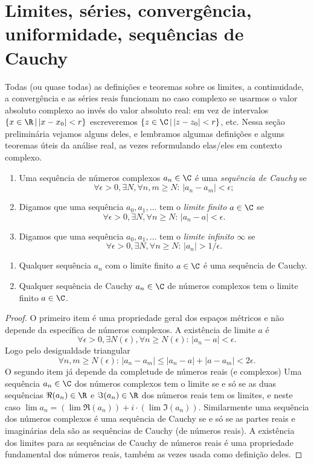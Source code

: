 \section{Limites, séries, convergência, uniformidade, sequências de Cauchy}

Todas (ou quase todas) as definições e teoremas sobre os limites, a continuidade,
a convergência e as séries reais funcionam no caso complexo
se usarmos o valor absoluto complexo ao invés do valor absoluto real:
em vez de intervalos $\{x\in \R\,|\,|x-x_0|<r\}$ escreveremos $\{z\in \C\,|\,|z-z_0|<r\}$, etc.
Nessa seção preliminária vejamos alguns deles, e lembramos algumas definições
e alguns teoremas úteis da análise real, as vezes reformulando elas/eles em contexto complexo.

\begin{defin}
\begin{enumerate}
\item Uma sequência de números complexos $a_n\in\C$ é uma \emph{sequência de Cauchy} se
\[ \forall \epsilon>0, \exists N, \forall n,m\geq N:\, |a_n-a_m| <\epsilon; \]
\item Digamos que uma sequência $a_0,a_1,\dots$ tem o \emph{limite finito} $a\in\C$ se
\[ \forall \epsilon> 0, \exists N, \forall n\geq N: \, |a_n-a| < \epsilon. \]
\item Digamos que uma sequência $a_0,a_1,\dots$ tem o \emph{limite infinito} $\infty$ se
\[ \forall \epsilon> 0, \exists N, \forall n\geq N: \, |a_n| > 1/\epsilon. \]
\end{enumerate}
\end{defin}

\begin{prop}
\label{cauchy-limite}
\begin{enumerate}
\item Qualquer sequência $a_n$ com o limite finito $a\in\C$ é uma sequência de Cauchy.
\item Qualquer sequência de Cauchy $a_n\in\C$ de números complexos tem o limite finito $a\in \C$.
\end{enumerate}
\end{prop}
\begin{proof}
O primeiro item é uma propriedade geral dos espaços métricos e não depende da específica de números complexos.
A existência de limite $a$ é
\[ \forall \epsilon>0, \exists N(\epsilon), \forall n\geq N(\epsilon): \, |a_n-a| <\epsilon . \]
Logo pelo desigualdade triangular
\[ \forall n,m\geq N(\epsilon): \, |a_n-a_m| \leq |a_n-a| + |a-a_m| < 2\epsilon . \]
O segundo item já depende da completude de números reais (e complexos)
Uma sequência $a_n \in \C$ dos números complexos
tem o limite se e só se as duas sequências $\Re(a_n)\in \R$ e $\Im(a_n)\in\R$
dos números reais tem os limites, e neste caso $\lim a_n = (\lim \Re(a_n)) + i \cdot (\lim \Im(a_n))$.
Similarmente uma sequência dos números complexos é uma sequência de Cauchy
se e só se as partes reais e imaginárias dela são as sequências de Cauchy (de números reais). 
A existência dos limites para as sequências de Cauchy de números reais
é uma propriedade fundamental dos números reais, também as vezes usada como definição deles.
\end{proof}

